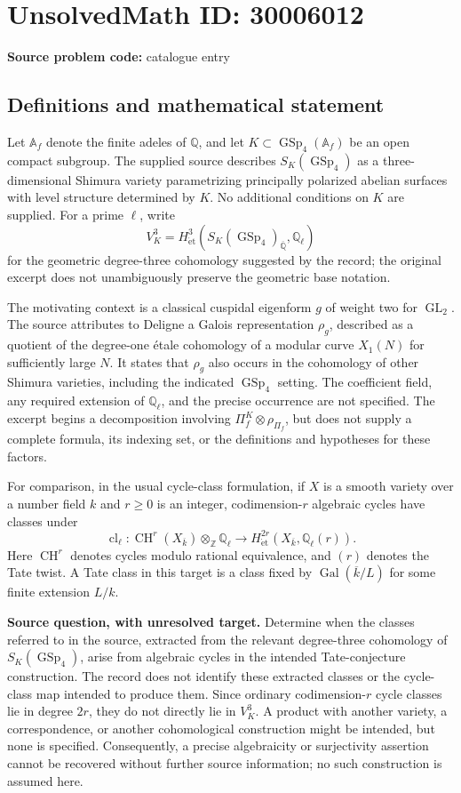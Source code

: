 \documentclass[11pt]{article}
\newcommand{\Z}{\mathbb{Z}}
\newcommand{\Q}{\mathbb{Q}}
\newcommand{\A}{\mathbb{A}}
\begin{document}
\section*{UnsolvedMath ID: 30006012}
\textbf{Source problem code:} catalogue entry
\subsection{Definitions and mathematical statement}
Let \(\A_f\) denote the finite adeles of \(\Q\), and let \(K\subset\operatorname{GSp}_4(\A_f)\) be an open compact subgroup. The supplied source describes \(S_K(\operatorname{GSp}_4)\) as a three-dimensional Shimura variety parametrizing principally polarized abelian surfaces with level structure determined by \(K\). No additional conditions on \(K\) are supplied. For a prime \(\ell\), write
\[
V_K^3=H^3_{\mathrm{\acute et}}\!\left(S_K(\operatorname{GSp}_4)_{\overline{\Q}},\Q_\ell\right)
\]
for the geometric degree-three cohomology suggested by the record; the original excerpt does not unambiguously preserve the geometric base notation.

The motivating context is a classical cuspidal eigenform \(g\) of weight two for \(\operatorname{GL}_2\). The source attributes to Deligne a Galois representation \(\rho_g\), described as a quotient of the degree-one étale cohomology of a modular curve \(X_1(N)\) for sufficiently large \(N\). It states that \(\rho_g\) also occurs in the cohomology of other Shimura varieties, including the indicated \(\operatorname{GSp}_4\) setting. The coefficient field, any required extension of \(\Q_\ell\), and the precise occurrence are not specified. The excerpt begins a decomposition involving \(\Pi_f^K\otimes\rho_{\Pi_f}\), but does not supply a complete formula, its indexing set, or the definitions and hypotheses for these factors.

For comparison, in the usual cycle-class formulation, if \(X\) is a smooth variety over a number field \(k\) and \(r\geq 0\) is an integer, codimension-\(r\) algebraic cycles have classes under
\[
\operatorname{cl}_\ell:\operatorname{CH}^r(X_{\overline{k}})\otimes_{\Z}\Q_\ell
\longrightarrow H^{2r}_{\mathrm{\acute et}}(X_{\overline{k}},\Q_\ell(r)).
\]
Here \(\operatorname{CH}^r\) denotes cycles modulo rational equivalence, and \((r)\) denotes the Tate twist. A Tate class in this target is a class fixed by \(\operatorname{Gal}(\overline{k}/L)\) for some finite extension \(L/k\).

\textbf{Source question, with unresolved target.} Determine when the classes referred to in the source, extracted from the relevant degree-three cohomology of \(S_K(\operatorname{GSp}_4)\), arise from algebraic cycles in the intended Tate-conjecture construction. The record does not identify these extracted classes or the cycle-class map intended to produce them. Since ordinary codimension-\(r\) cycle classes lie in degree \(2r\), they do not directly lie in \(V_K^3\). A product with another variety, a correspondence, or another cohomological construction might be intended, but none is specified. Consequently, a precise algebraicity or surjectivity assertion cannot be recovered without further source information; no such construction is assumed here.
\end{document}
